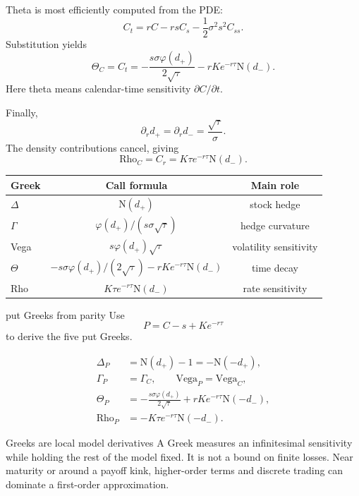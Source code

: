 \documentclass[10pt]{article}
\newcommand{\1}{\mathbf 1}
\newcommand{\Ncdf}{\mathrm N}
\newcommand{\phiN}{\varphi}
\theoremstyle{definition}
\begin{document}
Theta is most efficiently computed from the PDE:
\[
C_t=rC-rsC_s-\frac12\sigma^2s^2C_{ss}.
\]
Substitution yields
\[
\boxed{
\Theta_C=C_t
=-\frac{s\sigma\phiN(d_+)}{2\sqrt{\tau}}
-rKe^{-r\tau}\Ncdf(d_-).}
\]
Here theta means calendar-time sensitivity \(\partial C/\partial t\).

Finally,
\[
\partial_rd_+=\partial_rd_-=\frac{\sqrt{\tau}}{\sigma}.
\]
The density contributions cancel, giving
\[
\boxed{
\mathrm{Rho}_C=C_r
=K\tau e^{-r\tau}\Ncdf(d_-).}
\]

\begin{center}
\begin{tabular}{lcc}
\toprule
Greek & Call formula & Main role\\
\midrule
\(\Delta\) & \(\Ncdf(d_+)\) & stock hedge\\
\(\Gamma\) & \(\phiN(d_+)/(s\sigma\sqrt{\tau})\) & hedge curvature\\
Vega & \(s\phiN(d_+)\sqrt{\tau}\) & volatility sensitivity\\
\(\Theta\) &
\(-s\sigma\phiN(d_+)/(2\sqrt{\tau})-rKe^{-r\tau}\Ncdf(d_-)\)
& time decay\\
Rho & \(K\tau e^{-r\tau}\Ncdf(d_-)\) & rate sensitivity\\
\bottomrule
\end{tabular}
\end{center}

\begin{studentexercise}{put Greeks from parity}
Use
\[
P=C-s+Ke^{-r\tau}
\]
to derive the five put Greeks.
\end{studentexercise}
\begin{shortsolution}
\[
\begin{aligned}
\Delta_P&=\Ncdf(d_+)-1=-\Ncdf(-d_+),\\
\Gamma_P&=\Gamma_C,\qquad
\mathrm{Vega}_P=\mathrm{Vega}_C,\\
\Theta_P&=-\frac{s\sigma\phiN(d_+)}{2\sqrt{\tau}}
+rKe^{-r\tau}\Ncdf(-d_-),\\
\mathrm{Rho}_P&=-K\tau e^{-r\tau}\Ncdf(-d_-).
\end{aligned}
\]
\end{shortsolution}

\begin{warningbox}{Greeks are local model derivatives}
A Greek measures an infinitesimal sensitivity while holding the rest of the
model fixed. It is not a bound on finite losses. Near maturity or around a
payoff kink, higher-order terms and discrete trading can dominate a
first-order approximation.
\end{warningbox}
\end{document}
